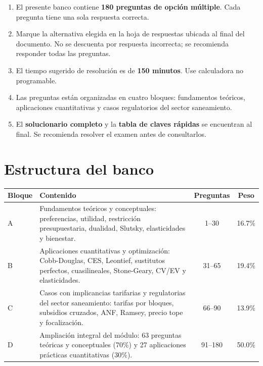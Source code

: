 \documentclass[11pt,a4paper]{article}
\begin{document}
\begin{enumerate}[label=\arabic*.,leftmargin=1.6em,itemsep=3pt]
  \item El presente banco contiene \textbf{180 preguntas de opción múltiple}. Cada pregunta tiene una sola respuesta correcta.
  \item Marque la alternativa elegida en la hoja de respuestas ubicada al final del documento. No se descuenta por respuesta incorrecta; se recomienda responder todas las preguntas.
  \item El tiempo sugerido de resolución es de \textbf{150 minutos}. Use calculadora no programable.
  \item Las preguntas están organizadas en cuatro bloques: fundamentos teóricos, aplicaciones cuantitativas y casos regulatorios del sector saneamiento.
  \item El \textbf{solucionario completo} y la \textbf{tabla de claves rápidas} se encuentran al final. Se recomienda resolver el examen antes de consultarlos.
\end{enumerate}

\section*{Estructura del banco}

\begin{center}
\renewcommand{\arraystretch}{1.25}
\begin{tabular}{@{}p{1.4cm}>{\raggedright\arraybackslash}p{7.6cm}cc@{}}
\toprule
\textbf{Bloque} & \textbf{Contenido} & \textbf{Preguntas} & \textbf{Peso} \\
\midrule
A & Fundamentos teóricos y conceptuales: preferencias, utilidad, restricción presupuestaria, dualidad, Slutsky, elasticidades y bienestar. & 1--30 & 16.7\% \\
B & Aplicaciones cuantitativas y optimización: Cobb-Douglas, CES, Leontief, sustitutos perfectos, cuasilineales, Stone-Geary, CV/EV y elasticidades. & 31--65 & 19.4\% \\
C & Casos con implicancias tarifarias y regulatorias del sector saneamiento: tarifas por bloques, subsidios cruzados, ANF, Ramsey, precio tope y focalización. & 66--90 & 13.9\% \\
D & Ampliación integral del módulo: 63 preguntas teóricas y conceptuales (70\%) y 27 aplicaciones prácticas cuantitativas (30\%). & 91--180 & 50.0\% \\
\bottomrule
\end{tabular}
\end{center}
\end{document}
